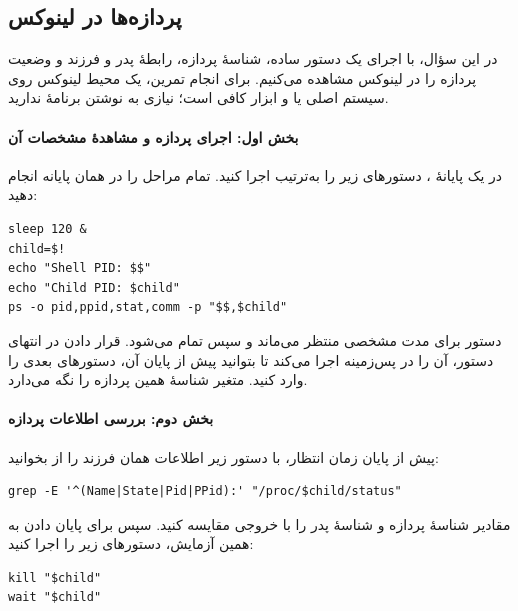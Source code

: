 \question
\subsection*{پردازه‌ها در لینوکس}

در این سؤال، با اجرای یک دستور ساده، شناسهٔ پردازه، رابطهٔ پدر و فرزند
و وضعیت پردازه را در لینوکس مشاهده می‌کنیم. برای انجام تمرین، یک محیط
لینوکس روی سیستم اصلی یا  و ابزار
 کافی است؛ نیازی به نوشتن برنامهٔ  ندارید.

\paragraph{بخش اول: اجرای پردازه و مشاهدهٔ مشخصات آن}
در یک پایانهٔ ، دستورهای زیر را به‌ترتیب اجرا کنید. تمام
مراحل را در همان پایانه انجام دهید:

\begin{latin}
\begin{verbatim}
sleep 120 &
child=$!
echo "Shell PID: $$"
echo "Child PID: $child"
ps -o pid,ppid,stat,comm -p "$$,$child"
\end{verbatim}
\end{latin}

دستور  برای مدت مشخصی منتظر می‌ماند و سپس تمام
می‌شود. قرار دادن \lr{\texttt{\&}} در انتهای دستور، آن را در پس‌زمینه
اجرا می‌کند تا بتوانید پیش از پایان آن، دستورهای بعدی را وارد کنید.
متغیر  شناسهٔ همین پردازه را نگه می‌دارد.

\paragraph{بخش دوم: بررسی اطلاعات پردازه}
پیش از پایان زمان انتظار، با دستور زیر اطلاعات همان فرزند را از
 بخوانید:

\begin{latin}
\begin{verbatim}
grep -E '^(Name|State|Pid|PPid):' "/proc/$child/status"
\end{verbatim}
\end{latin}

مقادیر شناسهٔ پردازه و شناسهٔ پدر را با خروجی
 مقایسه کنید. سپس برای پایان دادن به همین آزمایش،
دستورهای زیر را اجرا کنید:

\begin{latin}
\begin{verbatim}
kill "$child"
wait "$child"
\end{verbatim}
\end{latin}

